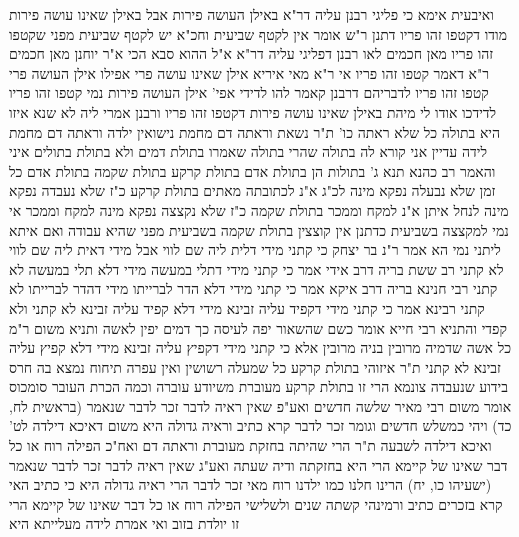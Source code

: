 \documentclass[12pt, openany]{book}
\begin{document}
{ואיבעית אימא כי פליגי רבנן עליה דר"א באילן העושה פירות אבל באילן שאינו עושה פירות מודו דקטפו זהו פריו דתנן ר"ש אומר אין לקטף שביעית וחכ"א יש לקטף שביעית מפני שקטפו זהו פריו 
מאן חכמים לאו רבנן דפליגי עליה דר"א א"ל ההוא סבא הכי א"ר יוחנן מאן חכמים ר"א דאמר קטפו זהו פריו 
אי ר"א מאי איריא אילן שאינו עושה פרי אפילו אילן העושה פרי קטפו זהו פריו לדבריהם דרבנן קאמר להו לדידי אפי' אילן העושה פירות נמי קטפו זהו פריו לדידכו אודו לי מיהת באילן שאינו עושה פירות דקטפו זהו פריו ורבנן אמרי ליה לא שנא
איזו היא בתולה כל שלא ראתה כו' ת"ר נשאת וראתה דם מחמת נישואין ילדה וראתה דם מחמת לידה עדיין אני קורא לה בתולה שהרי בתולה שאמרו בתולת דמים ולא בתולת בתולים 
איני והאמר רב כהנא תנא ג' בתולות הן בתולת אדם בתולת קרקע בתולת שקמה בתולת אדם כל זמן שלא נבעלה נפקא מינה לכ"ג א"נ לכתובתה מאתים 
בתולת קרקע כ"ז שלא נעבדה נפקא מינה לנחל איתן א"נ למקח וממכר 
בתולת שקמה כ"ז שלא נקצצה נפקא מינה למקח וממכר אי נמי למקצצה בשביעית כדתנן אין קוצצין בתולת שקמה בשביעית מפני שהיא עבודה ואם איתא ליתני נמי הא 
אמר ר"נ בר יצחק כי קתני מידי דלית ליה שם לווי אבל מידי דאית ליה שם לווי לא קתני רב ששת בריה דרב אידי אמר כי קתני מידי דתלי במעשה מידי דלא תלי במעשה לא קתני 
רבי חנינא בריה דרב איקא אמר כי קתני מידי דלא הדר לברייתו מידי דהדר לברייתו לא קתני רבינא אמר כי קתני מידי דקפיד עליה זבינא מידי דלא קפיד עליה זבינא לא קתני 
ולא קפדי והתניא רבי חייא אומר כשם שהשאור יפה לעיסה כך דמים יפין לאשה ותניא משום ר"מ כל אשה שדמיה מרובין בניה מרובין אלא כי קתני מידי דקפיץ עליה זבינא מידי דלא קפיץ עליה זבינא לא קתני 
ת"ר איזוהי בתולת קרקע כל שמעלה רשושין ואין עפרה תיחוח נמצא בה חרס בידוע שנעבדה צונמא הרי זו בתולת קרקע
מעוברת משיודע עוברה וכמה הכרת העובר סומכוס אומר משום רבי מאיר שלשה חדשים ואע"פ שאין ראיה לדבר זכר לדבר שנאמר (בראשית לח, כד) ויהי כמשלש חדשים וגומר 
זכר לדבר קרא כתיב וראיה גדולה היא משום דאיכא דילדה לט' ואיכא דילדה לשבעה 
ת"ר הרי שהיתה בחזקת מעוברת וראתה דם ואח"כ הפילה רוח או כל דבר שאינו של קיימא הרי היא בחזקתה ודיה שעתה 
ואע"ג שאין ראיה לדבר זכר לדבר שנאמר (ישעיהו כו, יח) הרינו חלנו כמו ילדנו רוח מאי זכר לדבר הרי ראיה גדולה היא כי כתיב האי קרא בזכרים כתיב
ורמינהי קשתה שנים ולשלישי הפילה רוח או כל דבר שאינו של קיימא הרי זו יולדת בזוב ואי אמרת לידה מעלייתא היא}
\end{document}
